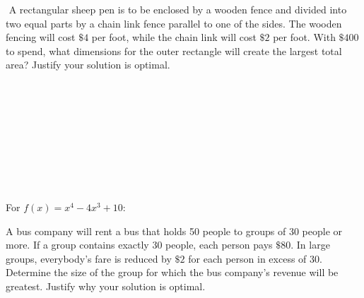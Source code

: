 \documentclass[addpoints,12pt]{exam}
\begin{document}
\begin{questions}
\newpage

\question[12]
​        A rectangular sheep pen is to be enclosed by a wooden fence and divided into two
equal parts by a chain link fence parallel to one of the sides. The wooden fencing will cost $\$4$
per foot, while the chain link will cost $\$ 2 $ per foot. With $\$400$ to spend, what dimensions
for the outer rectangle will create the largest total area? Justify your solution is optimal.

\bigskip

​        \begin{figure}[h]
​        ​       \begin{center}
​        ​       ​       
​       ​       \end{center}
​       ​       %
​       \end{figure}

\newpage

\question For $f(x)=x^4-4x^3+10 $:


\newpage




\question[12] A bus company will rent a bus that holds 50 people to groups of 30 people or
more. If a group contains exactly 30 people, each person pays $\$80$. In large groups,
everybody's fare is reduced by $\$2$ for each person in excess of 30. Determine the size of the
group for which the bus company's revenue will be greatest. Justify why your solution is optimal.





\end{questions}
\end{document}
